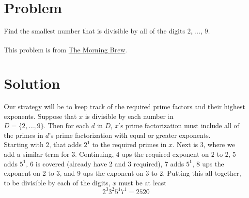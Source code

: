 \documentclass[11pt,a4paper]{report}
\theoremstyle{plain}
\theoremstyle{definition}
\theoremstyle{remark}
\begin{document}
\section*{Problem}
Find the smallest number that is divisible by all of the digits 2, ..., 9.
\\\\
This problem is from \href{https://www.morningbrew.com} {The Morning Brew}.

\section*{Solution} Our strategy will be to keep track of the required
prime factors and their highest exponents.  Suppose that $x$ is divisible by
each number in \\ $D = \{2, ..., 9\}.$  Then for each $d$ in $D$, $x$'s prime
factorization must include all of the primes in $d$'s prime factorization with
equal or greater exponents.  \\ Starting with 2, that adds $2^1$ to the required
primes in $x$.  Next is 3, where we add a similar term for 3.  Continuing, 4 ups
the required exponent on 2 to 2, 5 adds $5^1$, 6 is covered (already have 2 and
3 required), 7 adds $5^1$, 8 ups the exponent on 2 to 3,  and 9 ups the exponent
on 3 to 2.  Putting this all together, to be divisible by each of the digits,
$x$ must be at least $$ 2^{3}3^{2}5^{1}7^{1} = 2520 $$
\end{document}
